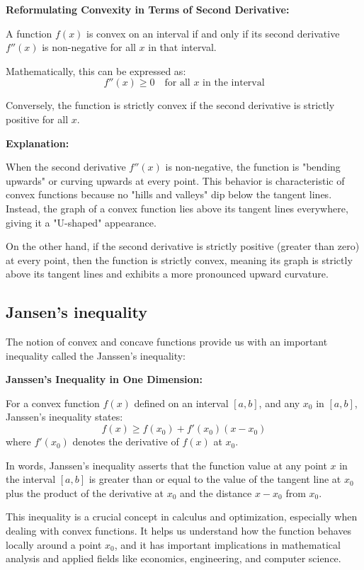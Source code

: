 \textbf{Reformulating Convexity in Terms of Second Derivative:}

A function $f(x)$ is convex on an interval if and only if its second derivative $f''(x)$ is non-negative for all $x$ in that interval.

Mathematically, this can be expressed as:
\[
f''(x) \geq 0 \quad \text{for all } x \text{ in the interval}
\]

Conversely, the function is strictly convex if the second derivative is strictly positive for all $x$.

\textbf{Explanation:}

When the second derivative $f''(x)$ is non-negative, the function is "bending upwards" or curving upwards at every point. This behavior is characteristic of convex functions because no "hills and valleys" dip below the tangent lines. Instead, the graph of a convex function lies above its tangent lines everywhere, giving it a "U-shaped" appearance.

On the other hand, if the second derivative is strictly positive (greater than zero) at every point, then the function is strictly convex, meaning its graph is strictly above its tangent lines and exhibits a more pronounced upward curvature.



\subsection{Jansen's inequality}

The notion of convex and concave functions provide us with an important inequality called the Janssen's inequality:

\textbf{Janssen's Inequality in One Dimension:}

For a convex function $f(x)$ defined on an interval $[a, b]$, and any $x_0$ in $[a, b]$, Janssen's inequality states:
\[
f(x) \geq f(x_0) + f'(x_0)(x - x_0)
\]
where $f'(x_0)$ denotes the derivative of $f(x)$ at $x_0$.

In words, Janssen's inequality asserts that the function value at any point $x$ in the interval $[a, b]$ is greater than or equal to the value of the tangent line at $x_0$ plus the product of the derivative at $x_0$ and the distance $x - x_0$ from $x_0$.

This inequality is a crucial concept in calculus and optimization, especially when dealing with convex functions. It helps us understand how the function behaves locally around a point $x_0$, and it has important implications in mathematical analysis and applied fields like economics, engineering, and computer science.



